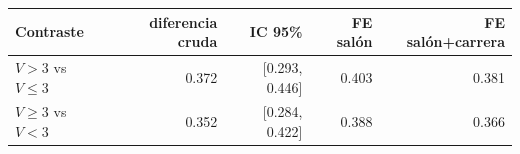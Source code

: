 \begin{tabular}{lrrrr}
\toprule
Contraste & diferencia cruda & IC 95\% & FE salón & FE salón+carrera \\
\midrule
$V>3$ vs $V\le3$ & 0.372 & [0.293, 0.446] & 0.403 & 0.381 \\
$V\ge3$ vs $V<3$ & 0.352 & [0.284, 0.422] & 0.388 & 0.366 \\
\bottomrule
\end{tabular}
